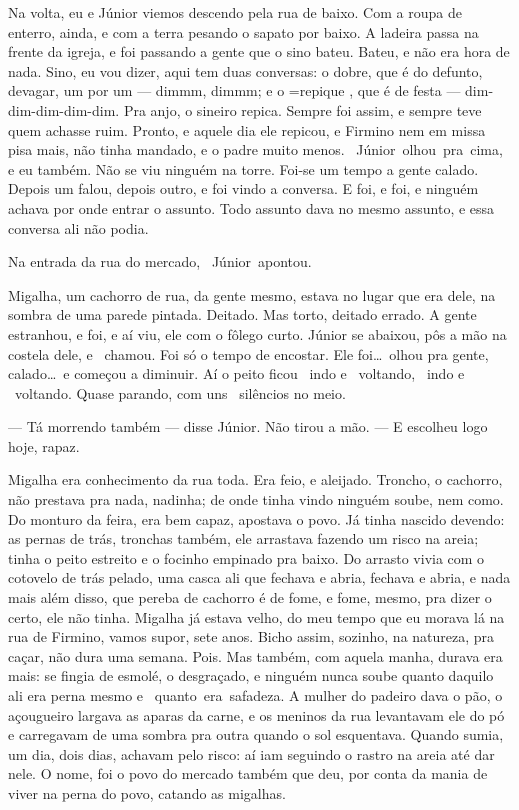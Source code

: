 \documentclass[a4paper,12pt]{extarticle}
\newcommand{\rb}[2]{\leavevmode\hbox{%
  \rlap{\raisebox{14.4pt}[0pt][0pt]{\color{rubired}\rubyfont #1}}#2}}
\newcommand{\rbpc}[2]{\leavevmode\begingroup
  \setbox0=\hbox{#2}%
  \hbox{\rlap{\hbox to \wd0{\hss
    \raisebox{14.4pt}[0pt][0pt]{\color{rubired}\pictofont #1}%
  \hss}}\box0}%
  \endgroup}
\newcommand{\lirio}{\rbpc{\char"269C}}
\begin{document}
Na volta, eu e Júnior viemos descendo pela rua de baixo. Com a roupa de enterro, ainda, e com a terra pesando o sapato por baixo. A ladeira passa na frente da igreja, e foi passando a gente que o sino bateu. Bateu, e não era hora de nada. Sino, eu vou dizer, aqui tem duas conversas: o dobre, que é do defunto, devagar, um por um --- dimmm, dimmm; e o \lirio{repique}, que é de festa --- dim-dim-dim-dim-dim. Pra anjo, o sineiro repica. Sempre foi assim, e sempre teve quem achasse ruim. Pronto, e aquele dia ele repicou, e Firmino nem em missa pisa mais, não tinha mandado, e o padre muito menos. \rb{— Ahn?}{Júnior olhou pra cima}, e eu também. Não se viu ninguém na torre. Foi-se um tempo a gente calado. Depois um falou, depois outro, e foi vindo a conversa. E foi, e foi, e ninguém achava por onde entrar o assunto. Todo assunto dava no mesmo assunto, e essa conversa ali não podia.

Na entrada da rua do mercado, \rb{— Olha lá}{Júnior apontou}.

Migalha, um cachorro de rua, da gente mesmo, estava no lugar que era dele, na sombra de uma parede pintada. Deitado. Mas torto, deitado errado. A gente estranhou, e foi, e aí viu, ele com o fôlego curto. Júnior se abaixou, pôs a mão na costela dele, e \rb{— Ei. Migalha. Psiu.}{chamou}. Foi só o tempo de encostar. Ele foi\ldots\ olhou pra gente, calado\ldots\ e começou a diminuir. Aí o peito ficou \rb{(---)}{indo} e \rb{(-)}{voltando}, \rb{(---)}{indo} e \rb{(-)}{voltando}. Quase parando, com uns \rb{(\ \ )}{silêncios} no meio.

— Tá morrendo também — disse Júnior. Não tirou a mão. — E escolheu logo hoje, rapaz.

Migalha era conhecimento da rua toda. Era feio, e aleijado. Troncho, o cachorro, não prestava pra nada, nadinha; de onde tinha vindo ninguém soube, nem como. Do monturo da feira, era bem capaz, apostava o povo. Já tinha nascido devendo: as pernas de trás, tronchas também, ele arrastava fazendo um risco na areia; tinha o peito estreito e o focinho empinado pra baixo. Do arrasto vivia com o cotovelo de trás pelado, uma casca ali que fechava e abria, fechava e abria, e nada mais além disso, que pereba de cachorro é de fome, e fome, mesmo, pra dizer o certo, ele não tinha. Migalha já estava velho, do meu tempo que eu morava lá na rua de Firmino, vamos supor, sete anos. Bicho assim, sozinho, na natureza, pra caçar, não dura uma semana. Pois. Mas também, com aquela manha, durava era mais: se fingia de esmolé, o desgraçado, e ninguém nunca soube quanto daquilo ali era perna mesmo e \rb{Aí é fácil demais.}{quanto era safadeza}. A mulher do padeiro dava o pão, o açougueiro largava as aparas da carne, e os meninos da rua levantavam ele do pó e carregavam de uma sombra pra outra quando o sol esquentava. Quando sumia, um dia, dois dias, achavam pelo risco: aí iam seguindo o rastro na areia até dar nele. O nome, foi o povo do mercado também que deu, por conta da mania de viver na perna do povo, catando as migalhas.
\end{document}
